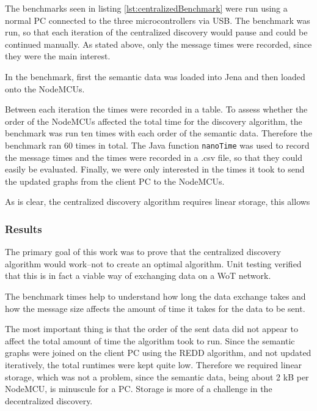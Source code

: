
The benchmarks seen in listing \ref{lst:centralizedBenchmark} were run using a normal PC connected to the three microcontrollers via USB. The benchmark was run, so that each iteration of the centralized discovery would pause and could be continued manually. As stated above, only the message times were recorded, since they were the main interest.

In the benchmark, first the semantic data was loaded into Jena and then loaded onto the NodeMCUs. 

Between each iteration the times were recorded in a table. To assess whether the order of the NodeMCUs affected the total time for the discovery algorithm, the benchmark was run ten times with each order of the semantic data. Therefore the benchmark ran 60 times in total. The Java function \texttt{nanoTime} was used to record the message times and the times were recorded in a .csv file, so that they could easily be evaluated. Finally, we were only interested in the times it took to send the updated graphs from the client PC to the NodeMCUs.





As is clear, the centralized discovery algorithm requires linear storage, this allows

\subsubsection{Results}
The primary goal of this work was to prove that the centralized discovery algorithm would work--not to create an optimal algorithm. Unit testing verified that this is in fact a viable way of exchanging data on a WoT network.

The benchmark times help to understand how long the data exchange takes and how the message size affects the amount of time it takes for the data to be sent.

The most important thing is that the order of the sent data did not appear to affect the total amount of time the algorithm took to run. Since the semantic graphs were joined on the client PC using the REDD algorithm, and not updated iteratively, the total runtimes were kept quite low. Therefore we required linear storage, which was not a problem, since the semantic data, being about 2 kB per NodeMCU, is minuscule for a PC. Storage is more of a challenge in the decentralized discovery.

